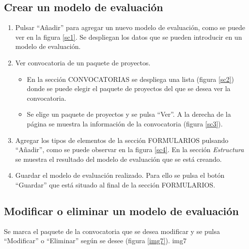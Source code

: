 \documentclass[12pt,a4paper,titlepage,spanish,twoside]{book}
\begin{document}
\subsection{Crear un modelo de evaluación}
\begin{enumerate}
\item Pulsar ``Añadir'' para agregar un nuevo modelo de evaluación, como se 
  puede ver en la figura \ref{sc1}. Se despliegan los datos que se pueden 
  introducir en un modelo de evaluación.
  

\item Ver convocatoria de un paquete de proyectos.
  \begin{itemize}
  \item En la sección CONVOCATORIAS se despliega una lista (figura \ref{sc2}) 
    donde se puede elegir el paquete de proyectos del que se desea ver la 
    convocatoria.


  \item Se elige un paquete de proyectos y se pulsa ``Ver''. A la derecha de la 
    página se muestra la información de la convocatoria (figura \ref{sc3}).

  \end{itemize}

\item Agregar los tipos de elementos de la sección FORMULARIOS pulsando 
  ``Añadir'', como se puede observar en la figura \ref{sc4}. En la sección 
  \emph{Estructura} se muestra el resultado del modelo de evaluación que se
  está creando.


\item Guardar el modelo de evaluación realizado. Para ello se pulsa el botón 
  ``Guardar'' que está situado al final de la sección FORMULARIOS.
\end{enumerate}

\subsection{Modificar o eliminar un modelo de evaluación}
Se marca el paquete de la convocatoria que se desea modificar y se pulsa 
``Modificar'' o ``Eliminar'' según se desee (figura \ref{img7}).
{img7}{}
\end{document}
